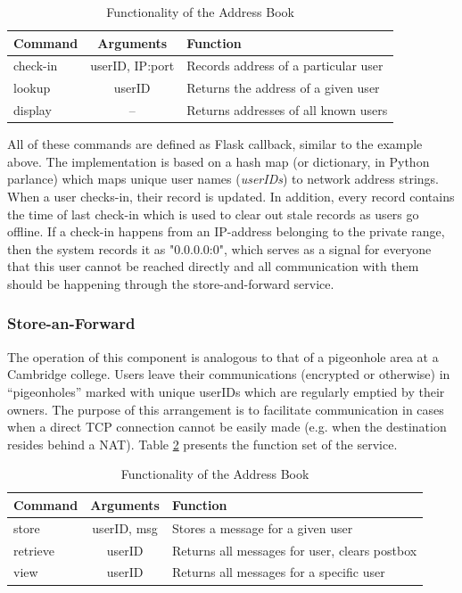\documentclass[a4paper, 12pt]{report}
\begin{document}
\begin{table}[H]
\centering
\begin{tabular*}{0.9\textwidth}{l | c | l}
    Command & Arguments & Function \\
    \hline
    check-in & userID, IP:port& Records address of a particular user \\
    lookup & userID & Returns the address of a given user \\
    display & --  & Returns addresses of all known users \\
\end{tabular*}
\caption{\label{tab:address_book} Functionality of the Address Book}
\end{table}

All of these commands are defined as Flask callback, similar to the example above. The implementation is based on a hash map (or dictionary, in Python parlance) which maps unique user names (\emph{userIDs}) to network address strings. When a user checks-in, their record is updated. In addition, every record contains the time of last check-in which is used to clear out stale records as users go offline. If a check-in happens from an IP-address belonging to the private range, then the system records it as "0.0.0.0:0", which serves as a signal for everyone that this user cannot be reached directly and all communication with them should be happening through the store-and-forward service.

\subsubsection{Store-an-Forward}
The operation of this component is analogous to that of a pigeonhole area at a Cambridge college. Users leave their communications (encrypted or otherwise) in ``pigeonholes'' marked with unique userIDs which are regularly emptied by their owners. The purpose of this arrangement is to facilitate communication in cases when a direct TCP connection cannot be easily made (e.g. when the destination resides behind a NAT). Table \ref{tab:saf} presents the function set of the service.

\begin{table}[H]
\centering
\begin{tabular*}{0.9\textwidth}{l | c | l}
    Command & Arguments & Function \\
    \hline
    store & userID, msg & Stores a message for a given user \\
    retrieve & userID & Returns all messages for user, clears postbox\\
    view & userID & Returns all messages for a specific user \\
\end{tabular*}
\caption{\label{tab:saf} Functionality of the Address Book}
\end{table}
\end{document}
